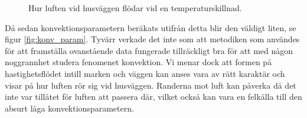 \begin{figure}[hpbt]
\begin{center}
\caption{\label{fig:velocityfield} Hur luften vid husväggen flödar vid en temperaturskillnad.}
\end{center}
\end{figure}

Då sedan konvektionsparametern beräkats utifrån detta blir den väldigt liten,
se figur \ref{fig:konv_param}. Tyvärr verkade det inte som att metodiken som användes
för att framställa ovanstående data fungerade tillräckligt bra för att med någon
noggrannhet studera fenomenet konvektion. Vi menar dock att formen på hastighetsflödet intill marken och väggen
kan anses vara av rätt karaktär och visar på hur luften rör sig vid husväggen. Randerna mot
luft kan påverka då det inte var tillåtet för luften att passera där, vilket också kan vara en felkälla till den absurt låga konvektionsparametern.

